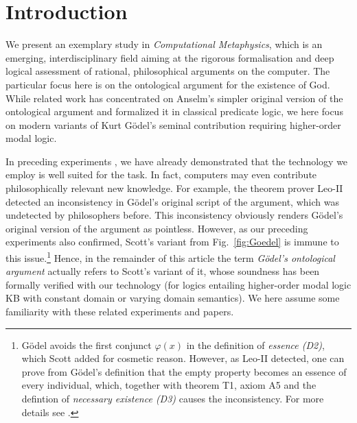 \documentclass{birkjour}
\theoremstyle{definition}
\theoremstyle{remark}
\numberwithin{equation}{section}
\begin{document}
\section{Introduction}
We present an exemplary study in \emph{Computational Metaphysics},
which is an emerging, interdisciplinary field aiming at the rigorous
formalisation and deep logical assessment of rational, philosophical
arguments on the computer.  The particular focus here is on the
ontological argument for the existence of God.  While related work
\citep{oppenheimer11,rushby13} has concentrated on Anselm's simpler original
version of the ontological argument and formalized it in classical
predicate logic, we here focus on modern variants of Kurt Gödel's seminal contribution
\citep{GoedelNotes} requiring
higher-order modal logic. 


In preceding experiments \citep{C55,C40,J30}, we have already
demonstrated that the technology we employ is well suited for the
task. In fact, computers may even contribute philosophically relevant
new knowledge. For example, the theorem prover Leo-II \cite{Leo-II}
detected an inconsistency in Gödel's original script
\citep{GoedelNotes} of the argument, which was undetected by
philosophers before.  This inconsistency obviously renders Gödel's
original version of the argument as pointless.  However, as our
preceding experiments also confirmed, Scott's variant
\citep{ScottNotes} from Fig.~\ref{fig:Goedel} is immune to this
issue.\footnote{Gödel avoids the first conjunct $\varphi(x)$ in the
  definition of \emph{essence (D2)}, which Scott added for cosmetic
  reason. However, as Leo-II detected, one can prove from Gödel's
  definition that the empty property becomes an essence of every
  individual, which, together with theorem T1, axiom A5 and the
  defintion of \emph{necessary existence (D3)} causes the
  inconsistency. For more details see \citet{C55}.} Hence, in the
remainder of this article the term \emph{Gödel's ontological argument}
actually refers to Scott's variant of it, whose soundness has been
formally 
verified with our technology (for logics entailing higher-order modal
logic KB with constant domain or varying domain semantics). We here
assume some familiarity with these related experiments and papers.
\end{document}
